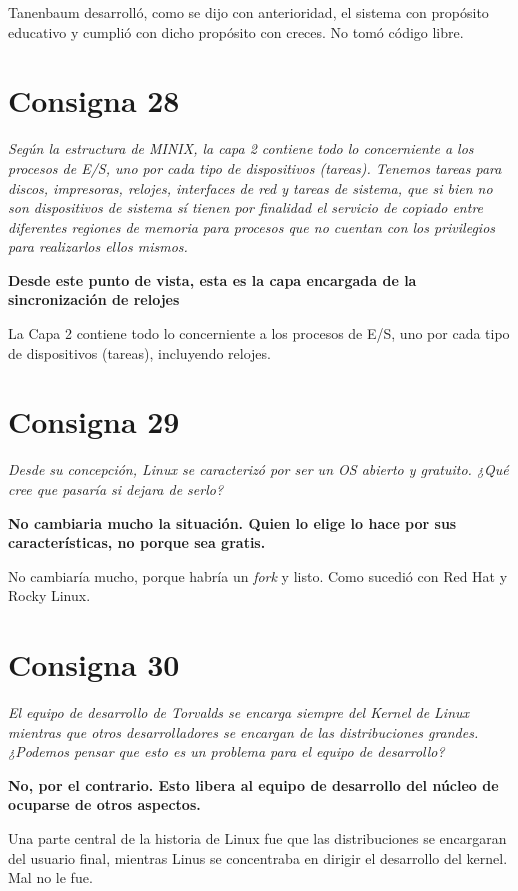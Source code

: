 \documentclass[11pt]{article}
\begin{document}
Tanenbaum desarrolló, como se dijo con anterioridad, el sistema con propósito 
educativo y cumplió con dicho propósito con creces. No tomó código libre.

\section*{Consigna 28}

\emph{
    Según la estructura de MINIX, la capa 2 contiene todo lo concerniente a los
    procesos de E/S, uno por cada tipo de dispositivos (tareas). Tenemos tareas
    para discos, impresoras, relojes, interfaces de red y tareas de sistema, que
    si bien no son dispositivos de sistema sí tienen por finalidad el servicio
    de copiado entre diferentes regiones de memoria para procesos que no cuentan
    con los privilegios para realizarlos ellos mismos.
}

\textbf{
    Desde este punto de vista, esta es la capa encargada de la sincronización de
    relojes
}

La Capa 2 contiene todo lo concerniente a los procesos de E/S, uno por cada tipo
de dispositivos (tareas), incluyendo relojes.

\section*{Consigna 29}

\emph{
    Desde su concepción, Linux se caracterizó por ser un OS abierto y gratuito.
    ¿Qué cree que pasaría si dejara de serlo?
}

\textbf{
    No cambiaria mucho la situación. Quien lo elige lo hace por sus
    características, no porque sea gratis.
}

No cambiaría mucho, porque habría un \textit{fork} y listo. Como sucedió con 
Red Hat y Rocky Linux.

\section*{Consigna 30}

\emph{
     El equipo de desarrollo de Torvalds se encarga siempre del Kernel de Linux
     mientras que otros desarrolladores se encargan de las distribuciones
     grandes. ¿Podemos pensar que esto es un problema para el equipo de
     desarrollo?
}

\textbf{No, por el contrario. Esto libera al equipo de desarrollo del núcleo de
ocuparse de otros aspectos.}

Una parte central de la historia de Linux fue que las distribuciones se
encargaran del usuario final, mientras Linus se concentraba en dirigir el 
desarrollo del kernel. Mal no le fue.
\end{document}
